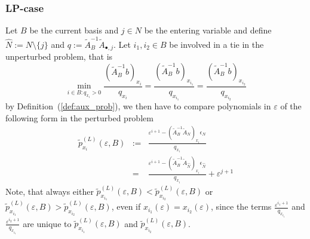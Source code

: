 \documentclass[a4paper]{article}
\newcommand{\xe}[1]{\ensuremath{x_{#1}(\varepsilon)}}
\begin{document}
\subsubsection{LP-case}
Let $B$ be the current basis and $j \in N$ be the entering variable
and define $\hat{N}:= N \setminus\{j\}$ and
$q:= \tilde{A}_{B}^{-1}\tilde{A}_{\bullet,j}$.
Let $i_{1}, i_{2} \in B$ be
involved in a tie in the unperturbed problem, that is
\begin{equation*}
  \min_{i \in B: q_{x_{i}} > 0}
  \frac{\left(\tilde{A}_{B}^{-1}b\right)_{x_{i}}}{q_{x_{i}}}
  =
  \frac{\left(\tilde{A}_{B}^{-1}b\right)_{x_{i_{1}}}}{q_{x_{i_{1}}}}
  =
  \frac{\left(\tilde{A}_{B}^{-1}b\right)_{x_{i_{2}}}}{q_{x_{i_{2}}}}
\end{equation*}
by Definition~(\ref{def:aux_prob}),  we then have to compare
polynomials in $\varepsilon$ of the following form in the perturbed problem
\begin{eqnarray}
\tilde{p}_{x_{i}}^{(L)}\left(\varepsilon, B\right) & := &
  \frac{\varepsilon^{i+1}
  - \left(\tilde{A}_{B}^{-1}\tilde{A}_{N}\right)_{x_{i}}
  \epsilon_{N}}{q_{x_{i}}} \nonumber \\
\label{def:p_x_i_tilde}
 & = &
  \frac{\varepsilon^{i+1}
  - \left(\tilde{A}_{B}^{-1}\tilde{A}_{\hat{N}}\right)_{x_{i}}
  \epsilon_{\hat{N}}}{q_{x_{i}}}
  + \varepsilon^{j+1}
\end{eqnarray}
Note, that always either $\tilde{p}_{x_{i_{1}}}^{(L)}
\left(\varepsilon, B\right) <
\tilde{p}_{x_{i_{2}}}^{(L)}\left(\varepsilon, B\right)$ or
$\tilde{p}_{x_{i_{1}}}^{(L)}\left(\varepsilon, B\right) >
\tilde{p}_{x_{i_{2}}}^{(L)}\left(\varepsilon, B\right)$, even if
$\xe{i_{1}} = \xe{i_{2}}$,
since the terms $\frac{\varepsilon^{i_{1}+1}}{q_{x_{i_{1}}}}$ and
$\frac{\varepsilon^{i_{2}+1}}{q_{x_{i_{1}}}}$ are unique to
$\tilde{p}_{x_{i_{1}}}^{(L)}\left(\varepsilon, B\right)$ and
$\tilde{p}_{x_{i_{2}}}^{(L)}\left(\varepsilon, B\right)$. 
\end{document}
